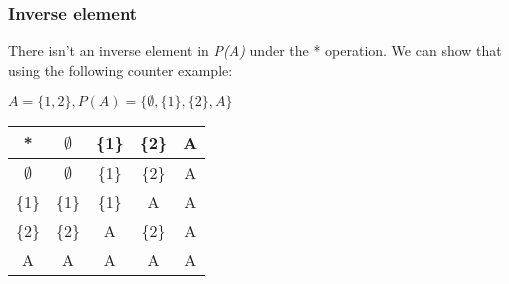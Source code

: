 \documentclass[12pt, oneside]{article}
\begin{document}
\subsubsection{Inverse element}
There isn't an inverse element in \emph{P(A)} under the * operation. We can show that using the following counter example:
\begin{center}
$A = \{1, 2\}, P(A) = \{\emptyset, \{1\}, \{2\}, A\}$\\
\hfill\break
\begin{tabular}{c|c|c|c|c}
* & $\emptyset$ & \{1\} & \{2\} & A\\
\hline
$\emptyset$ & $\emptyset$ & \{1\} & \{2\} & A\\
\hline
\{1\} & \{1\} & \{1\} & A & A\\
\hline
\{2\} & \{2\} & A & \{2\} & A\\
\hline
A & A & A & A & A
\end{tabular}
\end{center}
\end{document}
